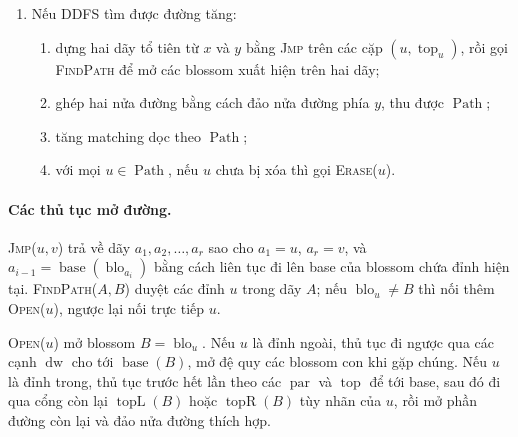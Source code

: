 \documentclass[11pt]{article}
\begin{document}
\begin{enumerate}
\begin{enumerate}
    \item với mỗi \(u\in B\), đặt \(\operatorname{blo}_u\leftarrow B\). Nếu
    \(u\) là đỉnh ngoài thì đặt
    \(\operatorname{oddlevel}_u\leftarrow 2k+1-\operatorname{evenlevel}_u\);
    nếu không, đặt
    \(\operatorname{evenlevel}_u\leftarrow 2k+1-\operatorname{oddlevel}_u\),
    đưa \(u\) vào \(\operatorname{que}(\operatorname{evenlevel}_u)\), và với
    mọi \(v\in\operatorname{anomaly}(u)\), đưa \((u,v)\) vào
    \(\operatorname{bridge}(\operatorname{evenlevel}_u+\operatorname{evenlevel}_v+1)\).
  \end{enumerate}
  \item Nếu DDFS tìm được đường tăng:
  \begin{enumerate}
    \item dựng hai dãy tổ tiên từ \(x\) và \(y\) bằng \textsc{Jmp} trên các
    cặp \((u,\operatorname{top}_u)\), rồi gọi \textsc{FindPath} để mở các
    blossom xuất hiện trên hai dãy;
    \item ghép hai nửa đường bằng cách đảo nửa đường phía \(y\), thu được
    \(\operatorname{Path}\);
    \item tăng matching dọc theo \(\operatorname{Path}\);
    \item với mọi \(u\in\operatorname{Path}\), nếu \(u\) chưa bị xóa thì gọi
    \textsc{Erase}(\(u\)).
  \end{enumerate}
\end{enumerate}

\paragraph{Các thủ tục mở đường.}
\textsc{Jmp}(\(u,v\)) trả về dãy
\(a_1,a_2,\ldots,a_r\) sao cho \(a_1=u\), \(a_r=v\), và
\(a_{i-1}=\operatorname{base}(\operatorname{blo}_{a_i})\) bằng cách liên tục đi
lên base của blossom chứa đỉnh hiện tại. \textsc{FindPath}(\(A,B\)) duyệt các
đỉnh \(u\) trong dãy \(A\); nếu \(\operatorname{blo}_u\ne B\) thì nối thêm
\textsc{Open}(\(u\)), ngược lại nối trực tiếp \(u\).

\textsc{Open}(\(u\)) mở blossom \(B=\operatorname{blo}_u\). Nếu \(u\) là đỉnh
ngoài, thủ tục đi ngược qua các cạnh \(\operatorname{dw}\) cho tới
\(\operatorname{base}(B)\), mở đệ quy các blossom con khi gặp chúng. Nếu \(u\)
là đỉnh trong, thủ tục trước hết lần theo các \(\operatorname{par}\) và
\(\operatorname{top}\) để tới base, sau đó đi qua cổng còn lại
\(\operatorname{topL}(B)\) hoặc \(\operatorname{topR}(B)\) tùy nhãn của \(u\),
rồi mở phần đường còn lại và đảo nửa đường thích hợp.
\end{document}
